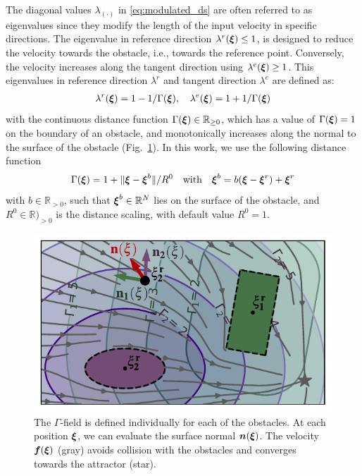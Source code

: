 The  diagonal values $\lambda_{(\cdot)}$  in \eqref{eq:modulated_ds} are often referred to as eigenvalues since they modify the length of the input velocity in specific directions. 
The eigenvalue in reference direction $\lambda^r(\boldsymbol{\xi}) \leq 1$, is designed to reduce the velocity towards the obstacle, i.e., towards the reference point.  
Conversely, the velocity increases along the tangent direction using $\lambda^e(\boldsymbol{\xi}) \geq 1$. This eigenvalues in reference direction $\lambda^r$ and tangent direction $\lambda^e$ are defined as:
\begin{equation}
\begin{split}
    \lambda^r(\vecs \xi) = 1 - 1 /\Gamma(\vecs \xi) , \quad \lambda^e(\vecs \xi) = 1 + 1 / \Gamma(\vecs \xi)
    \label{eq:eigenvalues}
    \end{split}
\end{equation}
with the continuous distance function $\Gamma(\boldsymbol{\xi}) \in \mathbb{R}_{\geq 0}$, which has a value of $\Gamma(\boldsymbol{\xi}) = 1$ on the boundary of an obstacle, and monotonically increases along the normal to the surface of the obstacle (Fig.~\ref{fig:resultant_normal}). In this work, we use the following distance function
\begin{equation}
  \Gamma(\vecs \xi) = 1 + \| \vecs \xi - \vecs \xi^b \|  / R^0
  \quad \text{with} \quad
  \vecs \xi^b = b (\vecs \xi - \vecs \xi^r) + \vecs \xi^r
  \label{eq:distance_function}
\end{equation}
with $b \in \mathbb{R}_{>0}$, such that $\boldsymbol{\xi}^b \in \mathbb{R}^N$ lies on the surface of the obstacle, and $R^0 \in \mathbb{R})_{>0}$ is the distance scaling, with default value $R^0 = 1$.

\begin{figure}
\centerline{\includegraphics[width=0.7\columnwidth]{figures/normal_and_gamma_field_visualization_annotated.pdf}}
\caption{
The $\Gamma$-field is defined individually for each of the obstacles. At each position $\boldsymbol{\xi}$, we can evaluate the surface normal $\boldsymbol{n}(\boldsymbol{\xi})$. 
The velocity $\boldsymbol{f}(\boldsymbol{\xi})$ (gray) avoids collision with the obstacles and converges towards the attractor (star).}
\label{fig:resultant_normal}
\end{figure}

